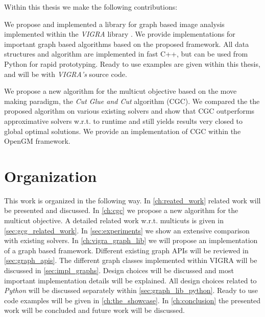 Within this thesis we make the following contributions:

\begin{compactitem}
    \item We propose and implemented a library for graph based image analysis 
        implemented within the \emph{VIGRA} library \cite{koethe_2000_phd_thesis,software_vigra}. We provide implementations for important graph based algorithms based on the proposed framework.
        All data structures and algorithm are implemented in fast C++, 
        but can be used from Python for rapid prototyping.
        Ready to use examples are given within this thesis, and will be 
        with \emph{VIGRA's} source code.



    \item 
        We propose a new algorithm for the multicut objective based on the move
        making paradigm, the \emph{Cut Glue and Cut} algorithm (CGC). We compared the 
        the proposed algorithm on various existing solvers and show
        that CGC outperforms approximative solvers w.r.t. to runtime and still yields
        results very closed to global optimal solutions. We provide an implementation of CGC within the OpenGM framework.



\end{compactitem}


\section{Organization}

This work is organized in the following way.
In \cref{ch:reated_work} related work will be presented and  discussed.
In \cref{ch:cgc} we propose a new algorithm for the multicut objective.
A detailed related work w.r.t. multicuts is given in \cref{sec:gcg_related_work}.
In \cref{sec:experiments} we show an extensive comparison  with existing solvers.
In \cref{ch:vigra_graph_lib} we will propose an implementation of
a graph based framework. 
Different existing graph APIs will be reviewed in \cref{sec:graph_apis}.
The different graph classes implemented within VIGRA
will be discussed in \cref{sec:impl_graphs}.
Design choices will be discussed and most 
important implementation details will be explained.
All design choices related to \emph{Python} will
be discussed separately within \cref{sec:graph_lib_python}.
Ready to use code examples will be given in \cref{ch:the_showcase}.
In \cref{ch:conclusion} the presented work will be concluded
and future work will be discussed.





